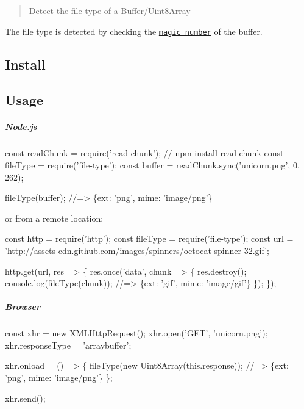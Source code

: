\begin{quote}
Detect the file type of a Buffer/\+Uint8\+Array \end{quote}


The file type is detected by checking the \href{http://en.wikipedia.org/wiki/Magic_number_(programming)#Magic_numbers_in_files}{\tt magic number} of the buffer.

\subsection*{Install}




\subsection*{Usage}

\subparagraph*{Node.\+js}


\begin{DoxyCode}
const readChunk = require('read-chunk'); // npm install read-chunk
const fileType = require('file-type');
const buffer = readChunk.sync('unicorn.png', 0, 262);

fileType(buffer);
//=> \{ext: 'png', mime: 'image/png'\}
\end{DoxyCode}


or from a remote location\+:


\begin{DoxyCode}
const http = require('http');
const fileType = require('file-type');
const url = 'http://assets-cdn.github.com/images/spinners/octocat-spinner-32.gif';

http.get(url, res => \{
  res.once('data', chunk => \{
    res.destroy();
    console.log(fileType(chunk));
    //=> \{ext: 'gif', mime: 'image/gif'\}
  \});
\});
\end{DoxyCode}


\subparagraph*{Browser}


\begin{DoxyCode}
const xhr = new XMLHttpRequest();
xhr.open('GET', 'unicorn.png');
xhr.responseType = 'arraybuffer';

xhr.onload = () => \{
  fileType(new Uint8Array(this.response));
  //=> \{ext: 'png', mime: 'image/png'\}
\};

xhr.send();
\end{DoxyCode}


